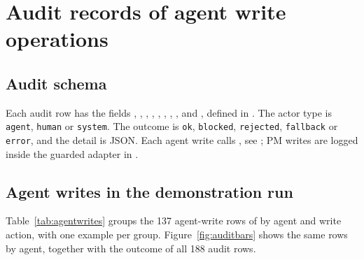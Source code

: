\chapter{Audit records of agent write operations}
\label{ch:audit}

\section{Audit schema}

Each audit row has the fields , , , , , , , ,  and , defined in . The actor type is \texttt{agent}, \texttt{human} or \texttt{system}. The outcome is \texttt{ok}, \texttt{blocked}, \texttt{rejected}, \texttt{fallback} or \texttt{error}, and the detail is JSON. Each agent write calls , see ; PM writes are logged inside the guarded adapter in .

\section{Agent writes in the demonstration run}

Table~\ref{tab:agentwrites} groups the 137 agent-write rows of  by agent and write action, with one example per group. Figure~\ref{fig:auditbars} shows the same rows by agent, together with the outcome of all 188 audit rows.


